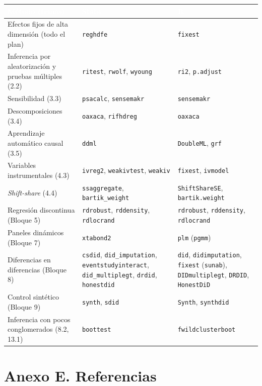 \documentclass[11pt,a4paper]{article}
\newcommand{\cab}[1]{\textcolor{white}{\sffamily\bfseries #1}}
\newcommand{\filasalternas}{\rowcolors{2}{white}{tonoPalido}}
\begin{document}
\medskip
{\small\filasalternas
\noindent\begin{tabularx}{\textwidth}{>{\raggedright\arraybackslash}p{4.2cm}>{\raggedright\arraybackslash}X>{\raggedright\arraybackslash}X}
\toprule
\rowcolor{tonoOscuro}\cab{Método (temas)} & \cab{Stata} & \cab{R} \\
\midrule
Efectos fijos de alta dimensión (todo el plan) & \texttt{reghdfe} & \texttt{fixest} \\
Inferencia por aleatorización y pruebas múltiples (2.2) & \texttt{ritest}, \texttt{rwolf}, \texttt{wyoung} & \texttt{ri2}, \texttt{p.adjust} \\
Sensibilidad (3.3) & \texttt{psacalc}, \texttt{sensemakr} & \texttt{sensemakr} \\
Descomposiciones (3.4) & \texttt{oaxaca}, \texttt{rifhdreg} & \texttt{oaxaca} \\
Aprendizaje automático causal (3.5) & \texttt{ddml} & \texttt{DoubleML}, \texttt{grf} \\
Variables instrumentales (4.3) & \texttt{ivreg2}, \texttt{weakivtest}, \texttt{weakiv} & \texttt{fixest}, \texttt{ivmodel} \\
\emph{Shift-share} (4.4) & \texttt{ssaggregate}, \texttt{bartik\_weight} & \texttt{ShiftShareSE}, \texttt{bartik.weight} \\
Regresión discontinua (Bloque 5) & \texttt{rdrobust}, \texttt{rddensity}, \texttt{rdlocrand} & \texttt{rdrobust}, \texttt{rddensity}, \texttt{rdlocrand} \\
Paneles dinámicos (Bloque 7) & \texttt{xtabond2} & \texttt{plm} (\texttt{pgmm}) \\
Diferencias en diferencias (Bloque 8) & \texttt{csdid}, \texttt{did\_imputation}, \texttt{eventstudyinteract}, \texttt{did\_multiplegt}, \texttt{drdid}, \texttt{honestdid} & \texttt{did}, \texttt{didimputation}, \texttt{fixest} (\texttt{sunab}), \texttt{DIDmultiplegt}, \texttt{DRDID}, \texttt{HonestDiD} \\
Control sintético (Bloque 9) & \texttt{synth}, \texttt{sdid} & \texttt{Synth}, \texttt{synthdid} \\
Inferencia con pocos conglomerados (8.2, 13.1) & \texttt{boottest} & \texttt{fwildclusterboot} \\
\bottomrule
\end{tabularx}
}

\section*{Anexo E. Referencias}
\end{document}
